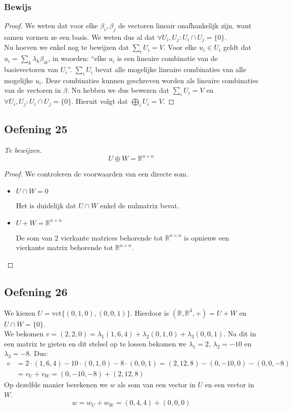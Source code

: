 \documentclass[lineaire_algebra_oplossingen.tex]{subfiles}
\begin{document}
\subsubsection*{Bewijs}
\begin{proof}
We weten dat voor elke $\beta_i,\beta_j$ de vectoren lineair onafhankelijk zijn, want samen vormen ze een basis. We weten dus al dat $\forall U_i,U_j: U_i \cap U_j = \{0\}$.\\
Nu hoeven we enkel nog te bewijzen dat $\sum_i U_i=V$. Voor elke $u_i \in U_i$ geldt dat $u_i = \sum_k\lambda_k\beta_{ik}$, in woorden: ``elke $u_i$ is een lineaire combinatie van de basisvectoren van $U_i$''. $\sum_i U_i$ bevat alle mogelijke lineaire combinaties van alle mogelijke $u_i$. Deze combinaties kunnen geschreven worden als lineaire combinaties van de vectoren in $\beta$. Nu hebben we dus bewezen dat $\sum_i U_i=V$ en $\forall U_i,U_j: U_i \cap U_j = \{0\}$. Hieruit volgt dat $\bigoplus_iU_i=V$.
\end{proof}


\subsection{Oefening 25}
\textit{Te bewijzen.}
\[
U \oplus W = \mathbb{R}^{n \times n}
\]

\begin{proof}
We controleren de voorwaarden van een directe som.
\begin{itemize}
\item $U \cap W = 0$

Het is duidelijk dat $U \cap W$ enkel de nulmatrix bevat.
\item $U+W = \mathbb{R}^{n \times n}$

De som van 2 vierkante matrices behorende tot $\mathbb{R}^{n \times n}$ is opnieuw een vierkante matrix behorende tot $\mathbb{R}^{n \times n}$.
\end{itemize}
\end{proof}

\subsection{Oefening 26}
We kiezen $U = \text{vct}\{(0,1,0), (0,0,1)\}$. Hierdoor is $(\mathbb{R}, \mathbb{R}^3, +) = U + W$ en $U \cap W = \{0\}$.\\
We bekomen $v = (2,2,0) = \lambda_1 (1,6,4) + \lambda_2 (0,1,0) + \lambda_3 (0,0,1)$. Na dit in een matrix te gieten en dit stelsel op te lossen bekomen we $\lambda_1 = 2$, $\lambda_2 = -10$ en $\lambda_3 = -8$. Dus:
\begin{align*}
v &= 2\cdot (1,6,4) -10\cdot (0,1,0) -8\cdot (0,0,1)
   = (2,12,8) - (0,-10,0) - (0,0,-8) \\
  &= v_U + v_W = (0,-10,-8) + (2,12,8)
\end{align*}
Op dezelfde manier berekenen we $w$ als som van een vector in $U$ en een vector in $W$.
\[
w = w_U + w_W = (0,4,4) + (0,0,0)
\]
\end{document}
